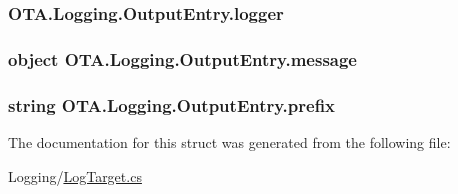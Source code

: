 \subsubsection[{logger}]{ O\+T\+A.\+Logging.\+Output\+Entry.\+logger}\label{struct_o_t_a_1_1_logging_1_1_output_entry_acbece06fc80da6ac6f2eaf5bad08bc97}
\hypertarget{struct_o_t_a_1_1_logging_1_1_output_entry_a352da5806e37d8f7091f0dfdcada285c}{}
\subsubsection[{message}]{\setlength{\rightskip}{0pt plus 5cm}object O\+T\+A.\+Logging.\+Output\+Entry.\+message}\label{struct_o_t_a_1_1_logging_1_1_output_entry_a352da5806e37d8f7091f0dfdcada285c}
\hypertarget{struct_o_t_a_1_1_logging_1_1_output_entry_a92edba73bf05c8e98e7db58c4f99be3d}{}
\subsubsection[{prefix}]{\setlength{\rightskip}{0pt plus 5cm}string O\+T\+A.\+Logging.\+Output\+Entry.\+prefix}\label{struct_o_t_a_1_1_logging_1_1_output_entry_a92edba73bf05c8e98e7db58c4f99be3d}


The documentation for this struct was generated from the following file\+:\begin{DoxyCompactItemize}
\item 
Logging/\hyperlink{_log_target_8cs}{Log\+Target.\+cs}\end{DoxyCompactItemize}
